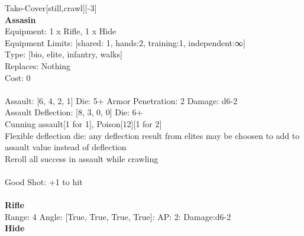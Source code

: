 \noindent Take-Cover[still,crawl][-3]\\ 


{\bf Assasin } \\
Equipment: 1 x Rifle, 1 x Hide \\
Equipment Limits: [shared: 1, hands:2, training:1, independent:∞] \\
Type: [bio, elite, infantry, walks] \\
Replaces: Nothing \\
Cost: 0\\
\ \\
Assault: [6, 4, 2, 1] Die: 5+ Armor Penetration: 2 Damage: d6-2 \\
Assault Deflection: [8, 3, 0, 0] Die: 6+\\
\indent Cunning assault[1 for 1], Poison[12][1 for 2]\\ 
Flexible deflection die: any deflection result from elites may be choosen to add to assault value instead of deflection\\ 
Reroll all success in assault while crawling\\ 
 
\ \\
Good Shot: +1 to hit\\ 

\ \\
{\bf Rifle } \\



Range: 4  Angle: [True, True, True, True]: AP: 2: Damage:d6-2 \\




{\bf Hide } \\

